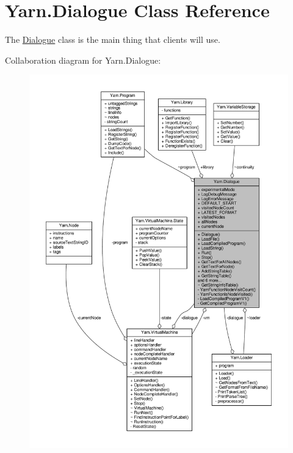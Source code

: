 \hypertarget{a00086}{\section{Yarn.\-Dialogue Class Reference}
\label{a00086}
}


The \hyperlink{a00086}{Dialogue} class is the main thing that clients will use.  




Collaboration diagram for Yarn.\-Dialogue\-:
\nopagebreak
\begin{figure}[H]
\begin{center}
\leavevmode
\includegraphics[width=350pt]{a00606}
\end{center}
\end{figure}

